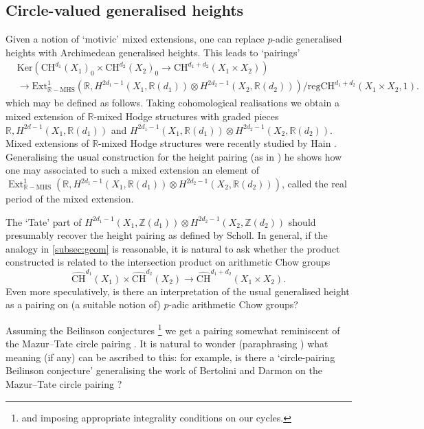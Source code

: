 \documentclass[11pt]{amsart}
\def\Z{\mathbb Z}
\newcommand{\R}{\mathbb{R}}
\newcommand{\MHS}{\mathrm{MHS}}
\newcommand{\Ext}{\mathrm{Ext}}
\newcommand{\reg}{\mathrm{reg}}
\theoremstyle{plain}
\theoremstyle{definition}
\newcommand{\Ker}{\mathrm{Ker}}
\newcommand{\CH}{\mathrm{CH}}
\DeclareMathOperator{\ext}{Ext}
\begin{document}
\subsection{Circle-valued generalised heights}
Given a notion of `motivic' mixed extensions, one can replace $p$-adic generalised heights with Archimedean generalised heights. This leads to `pairings'
\begin{align*}
& \Ker (\CH ^{d_1 }(X_1 )_0 \times \CH^{d_2 }(X_2 )_0 \to \CH ^{d_1 +d_2 }(X_1 \times X_2 )) \\
&  \to \Ext ^1 _{\mathbb{R}-\MHS }(\R ,H^{2d_1 -1}(X_1 ,\R (d_1 ))\otimes H^{2d_2 -1}(X_2 ,\R (d_2 ))) /\reg \CH ^{d_1 +d_2 }(X_1 \times X_2 ,1).
\end{align*}
which may be defined as follows. Taking cohomological realisations we obtain a mixed extension of $\mathbb{R}$-mixed Hodge structures with graded pieces $\R ,H^{2d-1}(X_1 ,\R (d_1 ))$ and $H^{2d_1 -1}(X_1 ,\R (d_1 ))\otimes H^{2d_2 -1}(X_2 ,\R (d_2 ))$. Mixed extensions of $\R $-mixed Hodge structures were recently studied by Hain \cite{hain2024periods}. Generalising the usual construction for the height pairing (as in \cite{scholl}) he shows how one may associated to such a mixed extension an element of $\ext ^1 _{\R -\MHS }(\R ,H^{2d_1 -1}(X_1 ,\R (d_1 ))\otimes H^{2d_2 -1}(X_2 ,\R (d_2 )))$, called the real period of the mixed extension.

The `Tate' part of $H^{2d_1 -1}(X_1 ,\Z (d_1 ))\otimes H^{2d_2 -1}(X_2 ,\Z (d_2 ))$ should presumably recover the height pairing as defined by Scholl. In general, if the analogy in \ref{subsec:geom} is reasonable, it is natural to ask whether the product constructed is related to the intersection product on arithmetic Chow groups \cite{BG}
\[
\widehat{\CH }^{d_1 }(X_1 )\times \widehat{\CH } ^{d_2 }(X_2 )\to \widehat{\CH }^{d_1 +d_2 }(X_1 \times X_2 ).
\]
Even more speculatively, is there an interpretation of the usual generalised height as a pairing on (a suitable notion of) $p$-adic arithmetic Chow groups?

Assuming the Beilinson conjectures \cite{beilinson:height} \footnote{and imposing appropriate integrality conditions on our cycles.} we get a pairing somewhat reminiscent of the Mazur--Tate circle pairing \cite{MT}. It is natural to wonder (paraphrasing \cite{BDMT}) what meaning (if any) can be ascribed to this: for example, is there a `circle-pairing Beilinson conjecture' generalising the work of Bertolini and Darmon on the Mazur--Tate circle pairing \cite{BDMT}?
\end{document}
